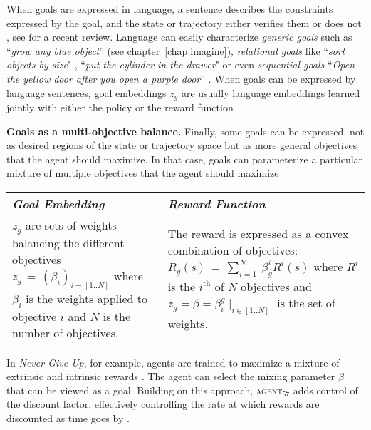 When goals are expressed in language, a sentence describes the constraints expressed by the goal, and the state or trajectory either verifies them or does not \citep{Hermann2017,chan2019actrce,Jiang2019,bahdanau2018learning,bahdanau2018systematic,hill2019emergent,ther,imagine,lynch2020grounding}, see \citet{Luketina2019} for a recent review. Language can easily characterize \textit{generic goals} such as ``\textit{grow any blue object}'' (see chapter~\ref{chap:imagine}), \textit{relational goals} like ``\textit{sort objects by size}" \citep{Jiang2019}, ``\textit{put the cylinder in the drawer}" \citep{lynch2020grounding} or even \textit{sequential goals} ``\textit{Open the yellow door after you open a purple door}'' \citep{chevalier-boisvert2018babyai}. When goals can be expressed by language sentences, goal embeddings $z_g$ are usually language embeddings learned jointly with either the policy or the reward function

\noindent \textbf{Goals as a multi-objective balance.} Finally, some goals can be expressed, not as desired regions of the state or trajectory space but as more general objectives that the agent should maximize. In that case, goals can parameterize a particular mixture of multiple objectives that the agent should maximize

\begin{table}[!h]
    \centering
    \small
    \begin{tabularx}{.85\linewidth}{X|X}
    \textit{Goal Embedding}  &    \textit{Reward Function}  \\
    \hline
    $z_g$ are sets of weights balancing the different objectives $z_g\,=\,(\beta_i)_{i=[1..N]}$ where $\beta_i$ is the weights applied to objective $i$ and $N$ is the number of objectives.
        & The reward is expressed as a convex combination of objectives: $R_g(s)\,=\,\sum_{i=1}^N~\beta_g^i R^i(s)$ where $R^i$ is the $i^\text{th}$ of $N$ objectives and $z_g=\beta=\beta_i^g\mid_{i\in[1..N]}$ is the set of weights.
    \end{tabularx}
\end{table}

In \textit{Never Give Up}, for example, \rl agents are trained to maximize a mixture of extrinsic and intrinsic rewards \citep{badia2020never}. The agent can select the mixing parameter $\beta$ that can be viewed as a goal. Building on this approach, \textsc{agent$_{57}$} adds control of the discount factor, effectively controlling the rate at which rewards are discounted as time goes by \citep{badia2020agent57}.


